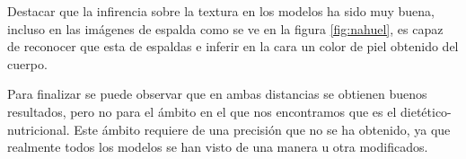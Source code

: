 Destacar que la infirencia sobre la textura en los modelos ha sido muy buena, incluso en las imágenes de espalda como se ve en la figura \ref{fig:nahuel}, es capaz de reconocer que esta de espaldas e inferir en la cara un color de piel obtenido del cuerpo.

Para finalizar se puede observar que en ambas distancias se obtienen buenos resultados, pero no para el ámbito en el que nos encontramos que es el dietético-nutricional.
Este ámbito requiere de una precisión que no se ha obtenido, ya que realmente todos los modelos se han visto de una manera u otra modificados.
